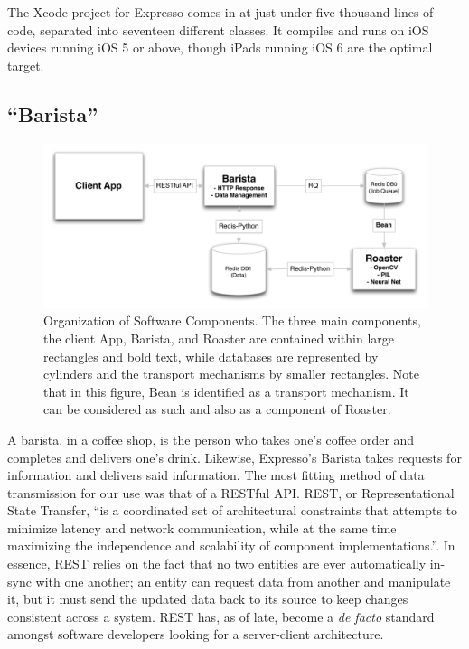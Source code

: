 \documentclass{acm_proc_article-sp}
\begin{document}
The Xcode project for Expresso comes in at just under five thousand lines of code, separated into seventeen different classes. It compiles and runs on iOS devices running iOS 5 or above, though iPads running iOS 6 are the optimal target.

\subsection{``Barista''}

\begin{figure}
\centering
\includegraphics[width=1.0\textwidth]{final_chart.pdf}
\caption{Organization of Software Components. The three main components, the client App, Barista, and Roaster are contained within large rectangles and bold text, while databases are represented by cylinders and the transport mechanisms by smaller rectangles. Note that in this figure, Bean is identified as a transport mechanism. It can be considered as such and also as a component of Roaster. }
\label{fig:final_chart}
\end{figure}

A barista, in a coffee shop, is the person who takes one's coffee order and completes and delivers one's drink. Likewise, Expresso's Barista takes requests for information and delivers said information. The most fitting method of data transmission for our use was that of a RESTful API. REST, or Representational State Transfer, ``is a coordinated set of architectural constraints that attempts to minimize latency and network communication, while at the same time maximizing the independence and scalability of component implementations.''\cite{Fielding:2002:PDM:514183.514185}. In essence, REST relies on the fact that no two entities are ever automatically in-sync with one another; an entity can request data from another and manipulate it, but it must send the updated data back to its source to keep changes consistent across a system. REST has, as of late, become a \emph{de facto} standard amongst software developers looking for a server-client architecture. 
\end{document}
